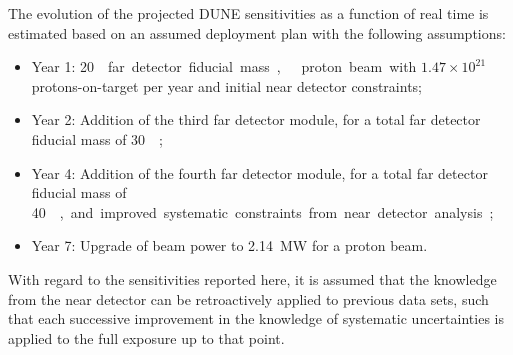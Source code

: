 
The evolution of the projected DUNE sensitivities as a function of real time is estimated based on an assumed deployment plan
with the following assumptions:
%
\begin{itemize}
\item Year 1: \SI{20}\kt{} far detector fiducial mass,  
  proton beam with $1.47 \times 10^{21}$ protons-on-target per year 
  and initial near detector constraints;
\item Year 2: Addition of the third  far detector module, for a total far detector fiducial mass of
  \SI{30}\kt;
\item Year 4: Addition of the fourth  far detector module, for a total far detector fiducial mass of
  \SI{40}\kt, and improved systematic constraints from near detector analysis;
 \item Year 7: Upgrade of beam power to \SI{2.14}{\MW} for a 
  proton beam.
\end{itemize}
With regard to the sensitivities reported here, it is assumed that the knowledge from the near detector can be
retroactively applied to previous data sets, such that each
successive improvement in the knowledge of systematic uncertainties
is applied to the full exposure
up to that point.

